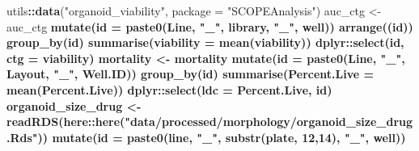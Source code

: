 \documentclass[
]{article}
\newenvironment{Shaded}{\begin{snugshade}}{\end{snugshade}}
\newcommand{\DataTypeTok}[1]{\textcolor[rgb]{0.13,0.29,0.53}{#1}}
\newcommand{\DecValTok}[1]{\textcolor[rgb]{0.00,0.00,0.81}{#1}}
\newcommand{\KeywordTok}[1]{\textcolor[rgb]{0.13,0.29,0.53}{\textbf{#1}}}
\newcommand{\NormalTok}[1]{#1}
\newcommand{\OperatorTok}[1]{\textcolor[rgb]{0.81,0.36,0.00}{\textbf{#1}}}
\newcommand{\StringTok}[1]{\textcolor[rgb]{0.31,0.60,0.02}{#1}}
\begin{document}
\begin{Shaded}
\begin{Highlighting}[]
\NormalTok{utils}\OperatorTok{::}\KeywordTok{data}\NormalTok{(}\StringTok{"organoid_viability"}\NormalTok{, }\DataTypeTok{package =} \StringTok{"SCOPEAnalysis"}\NormalTok{)}
\NormalTok{auc_ctg <-}\StringTok{ }\NormalTok{auc_ctg }\OperatorTok{%>%}\StringTok{ }\KeywordTok{filter}\NormalTok{(}\OperatorTok{!}\NormalTok{Line }\OperatorTok{%in%}\StringTok{ }\KeywordTok{c}\NormalTok{(}\StringTok{"D021T01"}\NormalTok{, }\StringTok{"D054T01"}\NormalTok{, }\StringTok{"D055T01"}\NormalTok{, }\StringTok{"D015T01"}\NormalTok{, }\StringTok{"D052T01"}\NormalTok{)) }\OperatorTok{%>%}\StringTok{ }
\StringTok{  }\KeywordTok{mutate}\NormalTok{(}\DataTypeTok{id =} \KeywordTok{paste0}\NormalTok{(Line, }\StringTok{"_"}\NormalTok{, library, }\StringTok{"_"}\NormalTok{, well)) }\OperatorTok{%>%}
\StringTok{  }\KeywordTok{arrange}\NormalTok{((id)) }\OperatorTok{%>%}
\StringTok{  }\KeywordTok{group_by}\NormalTok{(id) }\OperatorTok{%>%}\StringTok{ }
\StringTok{  }\KeywordTok{summarise}\NormalTok{(}\DataTypeTok{viability =} \KeywordTok{mean}\NormalTok{(viability)) }\OperatorTok{%>%}
\StringTok{  }\NormalTok{dplyr}\OperatorTok{::}\KeywordTok{select}\NormalTok{(id, }\DataTypeTok{ctg =}\NormalTok{ viability)}
\NormalTok{mortality <-}\StringTok{ }\NormalTok{mortality }\OperatorTok{%>%}\StringTok{ }\KeywordTok{filter}\NormalTok{(}\OperatorTok{!}\NormalTok{Line }\OperatorTok{%in%}\StringTok{ }\KeywordTok{c}\NormalTok{(}\StringTok{"D021T01"}\NormalTok{, }\StringTok{"D054T01"}\NormalTok{, }\StringTok{"D055T01"}\NormalTok{, }\StringTok{"D015T01"}\NormalTok{, }\StringTok{"D052T01"}\NormalTok{)) }\OperatorTok{%>%}\StringTok{ }
\StringTok{  }\KeywordTok{mutate}\NormalTok{(}\DataTypeTok{id =} \KeywordTok{paste0}\NormalTok{(Line, }\StringTok{"_"}\NormalTok{, Layout, }\StringTok{"_"}\NormalTok{, Well.ID)) }\OperatorTok{%>%}
\StringTok{  }\KeywordTok{group_by}\NormalTok{(id) }\OperatorTok{%>%}\StringTok{ }
\StringTok{  }\KeywordTok{summarise}\NormalTok{(}\DataTypeTok{Percent.Live =} \KeywordTok{mean}\NormalTok{(Percent.Live)) }\OperatorTok{%>%}
\StringTok{  }\NormalTok{dplyr}\OperatorTok{::}\KeywordTok{select}\NormalTok{(}\DataTypeTok{ldc =}\NormalTok{ Percent.Live, id)}
\NormalTok{organoid_size_drug <-}\StringTok{ }\KeywordTok{readRDS}\NormalTok{(here}\OperatorTok{::}\KeywordTok{here}\NormalTok{(}\StringTok{"data/processed/morphology/organoid_size_drug.Rds"}\NormalTok{)) }\OperatorTok{%>%}
\StringTok{  }\KeywordTok{mutate}\NormalTok{(}\DataTypeTok{id =} \KeywordTok{paste0}\NormalTok{(line, }\StringTok{"_"}\NormalTok{, }\KeywordTok{substr}\NormalTok{(plate, }\DecValTok{12}\NormalTok{,}\DecValTok{14}\NormalTok{), }\StringTok{"_"}\NormalTok{, well)) }\OperatorTok{%>%}\StringTok{ }
}}}}}}}}}}}
\end{Highlighting}
\end{Shaded}
\end{document}
